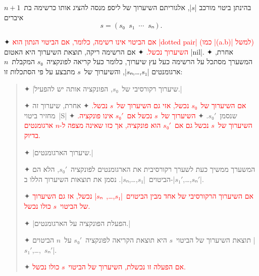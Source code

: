 \minipage\textwidth
\newcommand\exception[1]{{\textcolor{red}{#1}}}
\begin{mdframed}[backgroundcolor=Lavender!20]
  \footnotesize
  בהינתן ביטוי מורכב \E|$s$|, אלגוריתם השיערוך של ליספ מנסה
  להציג אותו כרשימה בת~$n+1$ איברים \[
    s=(s₀\;\;s₁\;\;⋯\;\;sₙ).
\] \begin{enumerate}
    ✦ \exception{
      אם הביטוי אינו רשימה, כלומר, אם הביטוי הנתון הוא \E|dotted pair| (כמו
      \E|(a.b)| למשל) השיערוך נכשל.}
    ✦ אם הרשימה ריקה, תוצאת השיערוך היא האטום \T|nil|.
    ✦ אחרת, המשערך מסתכל על הרשימה כעל עץ שיערוך, כלומר כעל קריאה
    לפונקציה~$s₀$ המקבלת~$n$ ארגומנטים \E|$s₁$,…,$sₙ$|, והשיערוך של~$s$ מתבצע
    על פי הסתכלות זו:
    \begin{quote}
      \begin{enumerate}
        ✦ \ע|שיערוך רקורסיבי של~$s₀$, הפונקציה אותה יש להפעיל.|
        \begin{itemize}
          ✦ \exception{אם השיערוך של~$s₀$ נכשל, אזי גם השיערוך של~$s$ נכשל.}
          ✦ אחרת, שיערוך זה מחזיר ביטוי~\E|S| שנסמן~$s₀'$.
          ✦ \exception{השיערוך של~$s$ נכשל אם~$s₀'$ אינו פונקציה.}
          ✦ \exception{השיערוך של~$s$ נכשל גם אם~$s₀'$ הוא פונקציה, אך כזו
            שאינה מצפה ל-$n$ ארגומנטים בדיוק.}
        \end{itemize}
        ✦ \ע|שיערוך הארגומנטים.|
        \begin{itemize}
          ✦ המשערך ממשיך כעת לשערך רקורסיבית את הארגומנטים לפונקציה~$s₀'$,
          הלא הם הביטוים~\E|$s₁$,…,$sₙ$|. נסמן את תוצאות השיערוך הללו
          ב-\E|$s₁'$,…,$sₙ'$|.

          ✦ \exception{אם השיערוך הרקורסיבי של אחד מבין
            הביטוים~\E|$s₁$,…,~$sₙ$| נכשל, אז גם השיערוך של הביטוי~$s$ כולו
            נכשל.}
        \end{itemize}

        ✦ \ע|הפעלת הפונקציה על הארגומנטים.|

        \begin{itemize}
          ✦ תוצאת השיערוך של הביטוי~$s$ היא תוצאת הקריאה לפונקציה~$s₀'$
          על~$n$ הביטוים \E|$s₁'$,…,~$sₙ'$|.

          ✦ \exception{אם הפעלה זו נכשלת, השיערוך של הביטוי~$s$ כולו נכשל.}
        \end{itemize}
      \end{enumerate}
    \end{quote}
  \end{enumerate}
\end{mdframed}
\endminipage

